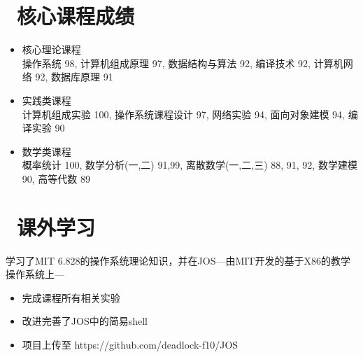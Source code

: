 \documentclass{resume}
\begin{document}


 
\section{\faGraduationCap\  核心课程成绩}
\begin{itemize}
\item 核心理论课程\\
  操作系统 98,
  计算机组成原理 97,
  数据结构与算法 92,
  编译技术 92,
  计算机网络 92,
  数据库原理 91
  \item 实践类课程\\
计算机组成实验 100,
操作系统课程设计 97,
网络实验 94,
面向对象建模 94,
编译实验 90
\item 数学类课程\\
概率统计 100,
数学分析(一,二) 91,99,
离散数学(一,二,三) 88, 91, 92,
数学建模 90,
高等代数 89
\end{itemize}


\section{\faUsers\ 课外学习}
学习了MIT 6.828的操作系统理论知识，并在JOS---由MIT开发的基于X86的教学操作系统上---
\begin{itemize}
  \item 
	完成课程所有相关实验
  \item 改进完善了JOS中的简易shell
  \item 项目上传至 https://github.com/deadlock-f10/JOS
\end{itemize}
\end{document}
